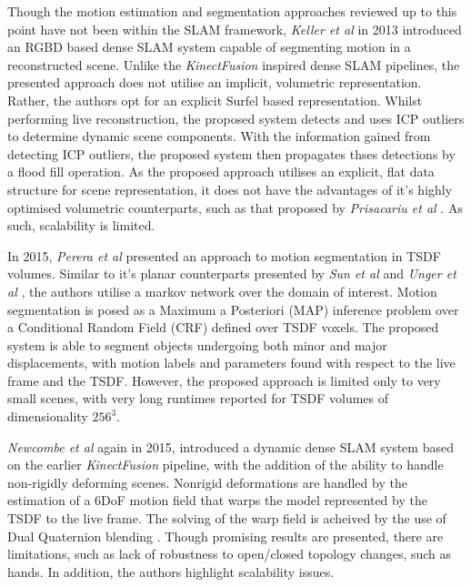 {Though the motion estimation and segmentation approaches reviewed up to this point have not 
been within the SLAM framework, \textit{Keller et al} \cite{Keller2013} in 2013 introduced an 
RGBD based dense SLAM system capable of segmenting motion in a reconstructed scene. Unlike the 
\textit{KinectFusion} \cite{Newcombe2011} inspired dense SLAM pipelines, the presented approach 
does not utilise an implicit, volumetric representation. Rather, the authors opt for an explicit 
Surfel \cite{Pfister2000} based representation. Whilst performing live reconstruction, the proposed 
system detects and uses ICP outliers to determine dynamic scene components. With the information gained 
from detecting ICP outliers, the proposed system then propagates thses detections by a flood fill operation. 
As the proposed approach utilises an explicit, flat data structure for scene representation, it does not 
have the advantages of it's highly optimised volumetric counterparts, such as that proposed by 
\textit{Prisacariu et al} \cite{Prisacariu2011}. As such, scalability is limited.

In 2015, \textit{Perera et al} \cite{Perera2015} presented an approach to motion segmentation in 
TSDF volumes. Similar to it's planar counterparts presented by \textit{Sun et al} \cite{Sun2012} 
and \textit{Unger et al} \cite{Unger2012}, the authors utilise a markov network over the domain 
of interest. Motion segmentation is posed as a Maximum a Posteriori (MAP) 
\cite{BishopPRML, Murphy2012ML} inference problem over a Conditional Random Field (CRF) 
\cite{Krahenbuhl2011} defined over TSDF voxels. The proposed system is able to segment objects 
undergoing both minor and major displacements, with motion labels and parameters found with 
respect to the live frame and the TSDF. However, the proposed approach is limited only to very 
small scenes, with very long runtimes reported for TSDF volumes of dimensionality $256^{3}$.

\textit{Newcombe et al} \cite{Newcombe2015} again in 2015, introduced a dynamic dense SLAM 
system based on the earlier \textit{KinectFusion} \cite{Newcombe2015} pipeline, with the addition 
of the ability to handle non-rigidly deforming scenes. Nonrigid deformations are handled by the 
estimation of a 6DoF motion field that warps the model represented by the TSDF to the live frame. The 
solving of the warp field is acheived by the use of Dual Quaternion blending \cite{Kavan2006}. 
Though promising results are presented, there are limitations, such as lack of robustness to 
open/closed topology changes, such as hands. In addition, the authors highlight scalability issues.

}
